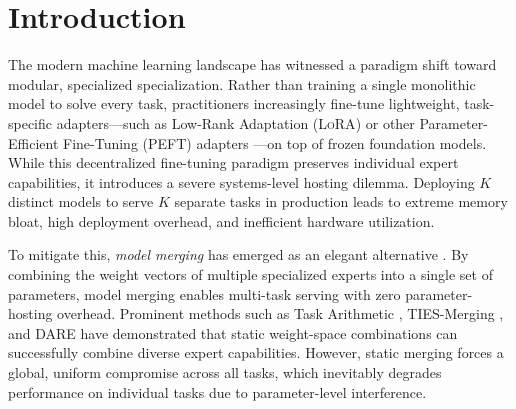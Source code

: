 \section{Introduction}
\label{sec:intro}

The modern machine learning landscape has witnessed a paradigm shift toward modular, specialized specialization. Rather than training a single monolithic model to solve every task, practitioners increasingly fine-tune lightweight, task-specific adapters—such as Low-Rank Adaptation (\textsc{LoRA}) \cite{hu2021lora} or other Parameter-Efficient Fine-Tuning (\textsc{PEFT}) adapters \cite{houlsby2019parameter, pfeiffer2020adapterhub}—on top of frozen foundation models. While this decentralized fine-tuning paradigm preserves individual expert capabilities, it introduces a severe systems-level hosting dilemma. Deploying $K$ distinct models to serve $K$ separate tasks in production leads to extreme memory bloat, high deployment overhead, and inefficient hardware utilization.

To mitigate this, \emph{model merging} has emerged as an elegant alternative \cite{wortsman2022robust, choshen2022fusing}. By combining the weight vectors of multiple specialized experts into a single set of parameters, model merging enables multi-task serving with zero parameter-hosting overhead. Prominent methods such as Task Arithmetic \cite{ilharco2022editing}, \textsc{TIES}-Merging \cite{yadav2023ties}, and \textsc{DARE} \cite{yu2023language} have demonstrated that static weight-space combinations can successfully combine diverse expert capabilities. However, static merging forces a global, uniform compromise across all tasks, which inevitably degrades performance on individual tasks due to parameter-level interference.

